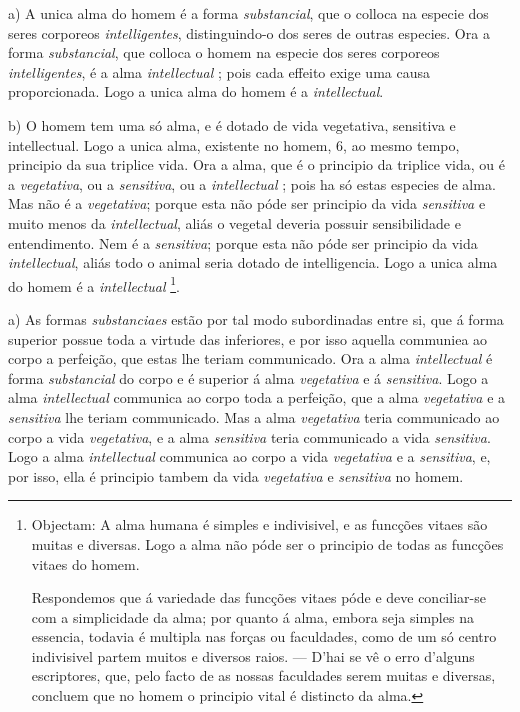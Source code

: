 
  

a) A unica alma do homem é a forma \emph{substancial}, que o colloca na especie dos seres corporeos \emph{intelligentes}, distinguindo-o dos seres de outras especies. Ora a forma \emph{substancial}, que colloca o homem na especie dos seres corporeos \emph{intelligentes}, é a alma \emph{intellectual} ; pois cada effeito exige uma causa proporcionada. Logo a unica alma do homem é a \emph{intellectual}.

b) O homem tem uma só alma, e é dotado de vida vegetativa, sensitiva e intellectual. Logo a unica alma, existente no homem, 6, ao mesmo tempo, principio da sua triplice vida. Ora a alma, que é o principio da triplice vida, ou é a \emph{vegetativa}, ou a \emph{sensitiva}, ou a \emph{intellectual} ; pois ha só estas especies de alma. Mas não é a \emph{vegetativa}; porque esta não póde ser principio da vida \emph{sensitiva} e muito menos da \emph{intellectual}, aliás o vegetal deveria possuir sensibilidade e entendimento. Nem   é a \emph{sensitiva}; porque esta não póde ser principio da vida \emph{intellectual}, aliás todo o animal seria dotado de intelligencia. Logo a unica alma do homem é a \emph{intellectual} \footnote{Objectam: A alma humana é simples e indivisivel, e as funcções vitaes são muitas e diversas. Logo a alma não póde ser o principio de todas as funcções vitaes do homem.\par Respondemos que á variedade das funcções vitaes póde e deve conciliar-se com a simplicidade da alma; por quanto á alma, embora seja simples na essencia, todavia é multipla nas forças ou faculdades, como de um só centro indivisivel partem muitos e diversos raios. --- D'hai se vê o erro d'alguns escriptores, que, pelo facto de as nossas faculdades serem muitas e diversas, concluem que no homem o principio vital é distincto da alma.}.


 

a) As formas \emph{substanciaes} estão por tal modo subordinadas entre si, que á forma superior possue toda a virtude das inferiores, e por isso aquella communiea ao corpo a perfeição, que estas lhe teriam communicado. Ora a alma \emph{intellectual} é forma \emph{substancial} do corpo e é superior á alma \emph{vegetativa} e á \emph{sensitiva}. Logo a alma \emph{intellectual} communica ao corpo toda a perfeição, que a alma \emph{vegetativa} e a \emph{sensitiva} lhe teriam communicado. Mas a alma \emph{vegetativa} teria communicado ao corpo a vida \emph{vegetativa}, e a alma \emph{sensitiva} teria communicado a vida \emph{sensitiva}. Logo a alma \emph{intellectual} communica ao corpo a vida \emph{vegetativa} e a \emph{sensitiva}, e, por isso, ella é principio tambem da vida \emph{vegetativa} e \emph{sensitiva} no homem.

